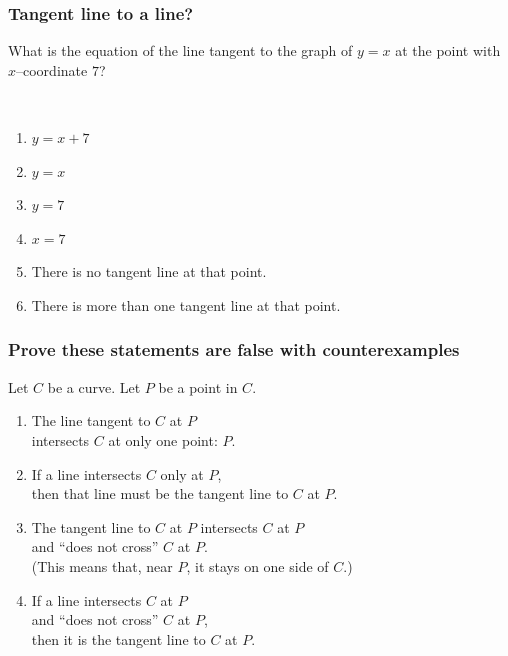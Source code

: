 \documentclass[14pt]{beamer}
\date{}
\title{}
\author{}
\newcommand {\DS} [1] {${\displaystyle #1}$}
\begin{document}

\begin{frame}[t]
\frametitle{Tangent line to a line?}

What is the equation of the line tangent to the graph of $y=x$ at the point with $x$--coordinate $7$?

\
\begin{enumerate}
	\item \DS{y=x+7}
	\item   \DS{y=x}
	\item  \DS{y=7}
	\item  \DS{x=7}
	\item  There is no tangent line at that point.
	\item  There is more than one tangent line at that point.
\end{enumerate}

\end{frame}

\begin{frame}
\frametitle{Prove these statements are false with counterexamples}

Let  $C$ be a curve. 
Let $P$ be a point in $C$.
\vfill
\begin{enumerate}
	\item The line tangent to $C$ at $P$ \\ intersects $C$ at only one point: $P$.
\vfill
	\item  If a line intersects $C$ only at $P$, \\ then that line must be the tangent line to $C$ at $P$.
\vfill
	\item  The tangent line to $C$ at $P$ intersects $C$ at $P$ \\ and ``does not cross'' $C$ at $P$.  \\ (This means that, near $P$, it stays on one side of $C$.)
\vfill
	\item  If a line intersects $C$ at $P$ \\ and ``does not cross'' $C$ at $P$, \\ then it is the tangent line to $C$ at $P$.
\vfill
\end{enumerate}

\end{frame}
\end{document}
